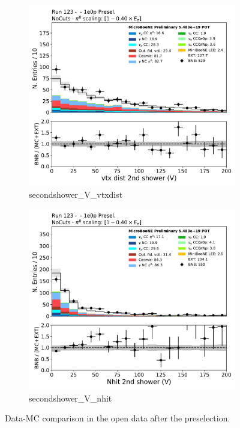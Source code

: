 \begin{figure}[H] 
\begin{center}
    \begin{subfigure}[b]{0.3\textwidth}
    \centering
    \includegraphics[width=1.00\textwidth]{1e0p/dataMCRun123/secondshower_V_vtxdist.pdf}
    \caption{\label{fig:1e0p:dataMCRun1:secondshower_V_vtxdist} secondshower\_V\_vtxdist }
    \end{subfigure}
    \begin{subfigure}[b]{0.3\textwidth}
    \centering
    \includegraphics[width=1.00\textwidth]{1e0p/dataMCRun123/secondshower_V_nhit.pdf}
    \caption{\label{fig:1e0p:dataMCRun1:secondshower_V_nhit} secondshower\_V\_nhit }
    \end{subfigure}
\caption{\label{fig:1e0p:dataMCRun1:pi01}Data-MC comparison in the open data after the \zpsel preselection.}
\end{center}
\end{figure}

